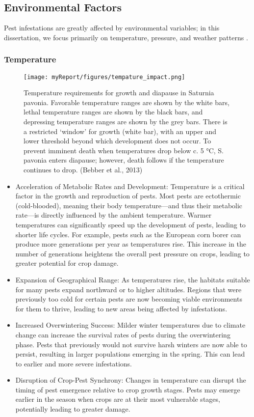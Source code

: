 \subsection{Environmental Factors}
Pest infestations are greatly affected by environmental variables; in this dissertation, we focus primarily on temperature, pressure, and weather patterns \cite{prasadygbambawaleom_2014_effects, skendi_2021_the}. 
\subsubsection{Temperature}
\begin{figure}[ht]
        \texttt{[image: myReport/figures/tempature\_impact.png]}
        \caption{Temperature requirements for growth and diapause in
        Saturnia pavonia. Favorable temperature ranges are shown by the
        white bars, lethal temperature ranges are shown by the black bars,
        and depressing temperature ranges are shown by the grey bars.
        There is a restricted `window' for growth (white bar), with an upper and lower threshold beyond which development does not occur. To prevent imminent death when temperatures drop below c.
        5 °C, S. pavonia enters diapause; however, death follows if the temperature continues to drop. (Bebber et al., 2013)}
\end{figure}
        \begin{itemize}
        \item Acceleration of Metabolic Rates and Development: Temperature is a critical factor in the growth and reproduction of pests. Most pests are ectothermic (cold-blooded), meaning their body temperature—and thus their metabolic rate—is directly influenced by the ambient temperature. Warmer temperatures can significantly speed up the development of pests, leading to shorter life cycles. For example, pests such as the European corn borer can produce more generations per year as temperatures rise. This increase in the number of generations heightens the overall pest pressure on crops, leading to greater potential for crop damage\cite{climate2}.
        \item  Expansion of Geographical Range: As temperatures rise, the habitats suitable for many pests expand northward or to higher altitudes. Regions that were previously too cold for certain pests are now becoming viable environments for them to thrive, leading to new areas being affected by infestations\cite{climate2}.
        \item Increased Overwintering Success: Milder winter temperatures due to climate change can increase the survival rates of pests during the overwintering phase. Pests that previously would not survive harsh winters are now able to persist, resulting in larger populations emerging in the spring. This can lead to earlier and more severe infestations.
        \item Disruption of Crop-Pest Synchrony: Changes in temperature can disrupt the timing of pest emergence relative to crop growth stages. Pests may emerge earlier in the season when crops are at their most vulnerable stages, potentially leading to greater damage.
        \end{itemize}
      
